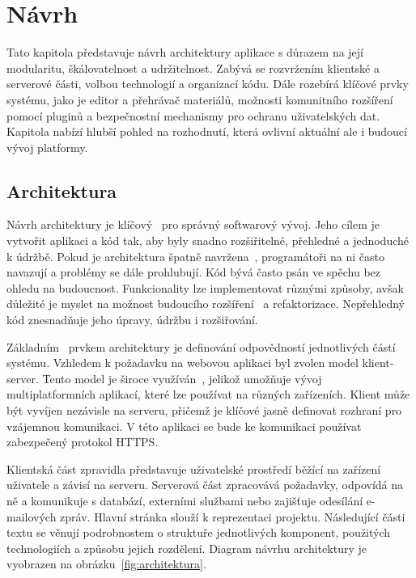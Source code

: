 \chapter{Návrh}\label{text:navrh}

\begin{chapterabstract}
Tato kapitola představuje návrh architektury aplikace s důrazem na její modularitu, škálovatelnost a udržitelnost. 
Zabývá se rozvržením klientské a serverové části, volbou technologií a organizací kódu. 
Dále rozebírá klíčové prvky systému, jako je editor a přehrávač materiálů, možnosti komunitního rozšíření pomocí pluginů a bezpečnostní mechanismy pro ochranu uživatelských dat. 
Kapitola nabízí hlubší pohled na rozhodnutí, která ovlivní aktuální ale i budoucí vývoj platformy.
\end{chapterabstract}

\section{Architektura}

Návrh architektury je klíčový~\cite{uml_2007} pro správný softwarový vývoj. 
Jeho cílem je vytvořit aplikaci a kód tak, aby byly snadno rozšiřitelné, přehledné a jednoduché k údržbě. 
Pokud je architektura špatně navržena~\cite{uml_2007}, programátoři na ni často navazují a problémy se dále prohlubují.
Kód bývá často psán ve spěchu bez ohledu na budoucnost. 
Funkcionality lze implementovat různými způsoby, avšak důležité je myslet na možnost budoucího rozšíření~\cite{sutherland_2014} a refaktorizace. 
Nepřehledný kód znesnadňuje jeho úpravy, údržbu i rozšiřování.

Základním~\cite{richards_2020} prvkem architektury je definování odpovědností jednotlivých částí systému. 
Vzhledem k požadavku na webovou aplikaci byl zvolen model klient-server. 
Tento model je široce využíván~\cite{richards_2020, uzayr2022frontend}, jelikož umožňuje vývoj multiplatformních aplikací, které lze používat na různých zařízeních. 
Klient může být vyvíjen nezávisle na serveru, přičemž je klíčové jasně definovat rozhraní pro vzájemnou komunikaci. 
V této aplikaci se bude ke komunikaci používat zabezpečený protokol HTTPS.

Klientská část zpravidla představuje uživatelské prostředí běžící na zařízení uživatele a závisí na serveru. 
Serverová část zpracovává požadavky, odpovídá na ně a komunikuje s databází, externími službami nebo zajišťuje odesílání e-mailových zpráv. 
Hlavní stránka slouží k reprezentaci projektu.
Následující části textu se věnují podrobnostem o struktuře jednotlivých komponent, použitých technologiích a způsobu jejich rozdělení. 
Diagram návrhu architektury je vyobrazen na obrázku~\ref{fig:architektura}.

